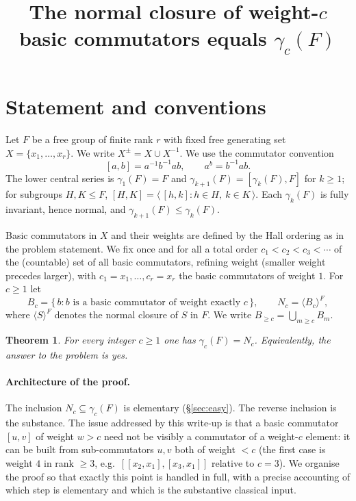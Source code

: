 \documentclass{amsart}
\newtheorem{theorem}{Theorem}
\theoremstyle{definition}
\theoremstyle{remark}
\begin{document}
\title{The normal closure of weight-$c$ basic commutators equals $\gamma_c(F)$}
\maketitle

\section{Statement and conventions}

Let $F$ be a free group of finite rank $r$ with fixed free generating set
$X=\{x_1,\dots,x_r\}$. We write $X^{\pm}=X\cup X^{-1}$. We use the commutator
convention
\[
[a,b]=a^{-1}b^{-1}ab ,\qquad a^{b}=b^{-1}ab .
\]
The lower central series is $\gamma_1(F)=F$ and $\gamma_{k+1}(F)=[\gamma_k(F),F]$
for $k\ge 1$; for subgroups $H,K\le F$,
$[H,K]=\langle\, [h,k] : h\in H,\ k\in K \,\rangle$.
Each $\gamma_k(F)$ is fully invariant, hence normal, and
$\gamma_{k+1}(F)\le\gamma_k(F)$.

Basic commutators in $X$ and their weights are defined by the Hall ordering as in
the problem statement. We fix once and for all a total order
$c_1<c_2<c_3<\cdots$ of the (countable) set of all basic commutators, refining
weight (smaller weight precedes larger), with $c_1=x_1,\dots,c_r=x_r$ the basic
commutators of weight $1$. For $c\ge 1$ let
\[
B_c=\{\,b : b \text{ is a basic commutator of weight exactly } c\,\},
\qquad
N_c=\langle B_c\rangle^{F},
\]
where $\langle S\rangle^{F}$ denotes the normal closure of $S$ in $F$. We write
$B_{\ge c}=\bigcup_{m\ge c}B_m$.

\begin{theorem}\label{thm:main}
For every integer $c\ge 1$ one has $\gamma_c(F)=N_c$. Equivalently, the answer to
the problem is \emph{yes}.
\end{theorem}

\paragraph{Architecture of the proof.}
The inclusion $N_c\subseteq\gamma_c(F)$ is elementary (\S\ref{sec:easy}). The
reverse inclusion is the substance. The issue addressed by this write-up is that a
basic commutator $[u,v]$ of weight $w>c$ need not be visibly a commutator of a
weight-$c$ element: it can be built from sub-commutators $u,v$ both of weight $<c$
(the first case is weight $4$ in rank $\ge3$, e.g.\ $[[x_2,x_1],[x_3,x_1]]$ relative
to $c=3$). We organise the proof so that exactly this point is handled in full, with a
precise accounting of which step is elementary and which is the substantive classical
input.
\end{document}
